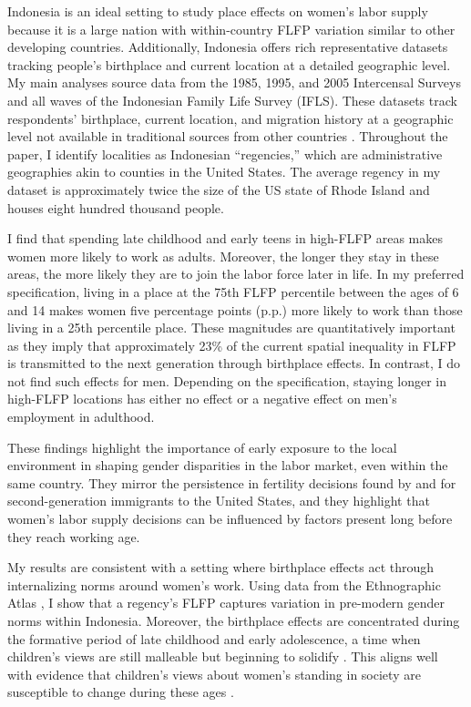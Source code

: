 \documentclass[a4paper, 11pt]{article}
\begin{document}
Indonesia is an ideal setting to study place effects on women's labor supply because it is a large nation with within-country FLFP variation similar to other developing countries. Additionally, Indonesia offers rich representative datasets tracking people's birthplace and current location at a detailed geographic level. My main analyses source data from the 1985, 1995, and 2005 Intercensal Surveys and all waves of the Indonesian Family Life Survey (IFLS). These datasets track respondents' birthplace, current location, and migration history at a geographic level not available in traditional sources from other countries \citep{Bryan2019}. Throughout the paper, I identify localities as Indonesian ``regencies,'' which are administrative geographies akin to counties in the United States. The average regency in my dataset is approximately twice the size of the US state of Rhode Island and houses eight hundred thousand people.

I find that spending late childhood and early teens in high-FLFP areas makes women more likely to work as adults. Moreover, the longer they stay in these areas, the more likely they are to join the labor force later in life. In my preferred specification, living in a place at the 75th FLFP percentile between the ages of 6 and 14 makes women five percentage points (p.p.) more likely to work than those living in a 25th percentile place. These magnitudes are quantitatively important as they imply that approximately 23\% of the current spatial inequality in FLFP is transmitted to the next generation through birthplace effects. In contrast, I do not find such effects for men. Depending on the specification, staying longer in high-FLFP locations has either no effect or a negative effect on men's employment in adulthood.

These findings highlight the importance of early exposure to the local environment in shaping gender disparities in the labor market, even within the same country. They mirror the persistence in fertility decisions found by \cite{Fernandeza} and \cite{Fernandez2009} for second-generation immigrants to the United States, and they highlight that women's labor supply decisions can be influenced by factors present long before they reach working age.


My results are consistent with a setting where birthplace effects act through internalizing norms around women's work. Using data from the Ethnographic Atlas \citep{Murdock1967}, I show that a regency's FLFP captures variation in pre-modern gender norms within Indonesia. Moreover, the birthplace effects are concentrated during the formative period of late childhood and early adolescence, a time when children's views are still malleable but beginning to solidify \citep{Markus1986}. This aligns well with evidence that children's views about women's standing in society are susceptible to change during these ages \citep{Dhar2022,Olivettib}.
\end{document}
